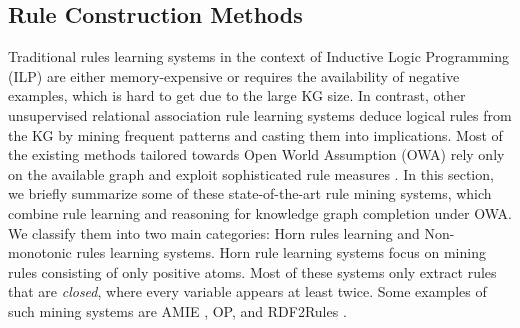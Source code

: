 \subsection{Rule Construction Methods}
Traditional rules learning systems in the context of Inductive Logic Programming (ILP) \cite{probfoil,DBLP:conf/ijcai/RaedtDTBV15,DBLP:conf/clima/CorapiSIR11} are either memory-expensive or requires the availability of negative examples, which is hard to get due to the large KG size. In contrast, other unsupervised relational 
association rule learning systems deduce logical rules from the KG by mining frequent patterns and casting them into implications. Most of the  existing methods tailored towards Open World Assumption (OWA) rely only on the available graph and exploit sophisticated rule measures \cite{amie,op,rumis}.
In this section, we briefly summarize some of these state-of-the-art rule mining systems, which combine rule learning and reasoning for knowledge graph completion under OWA. We classify them into two main categories: Horn rules learning and Non-monotonic rules learning systems.
Horn rule learning systems focus on mining rules consisting of only positive atoms. Most of these systems only extract rules that are \emph{closed}, where every variable appears at least twice. Some examples of such mining systems are AMIE \cite{amie}, OP, \cite{op} and RDF2Rules \cite{rdf2rules}.
